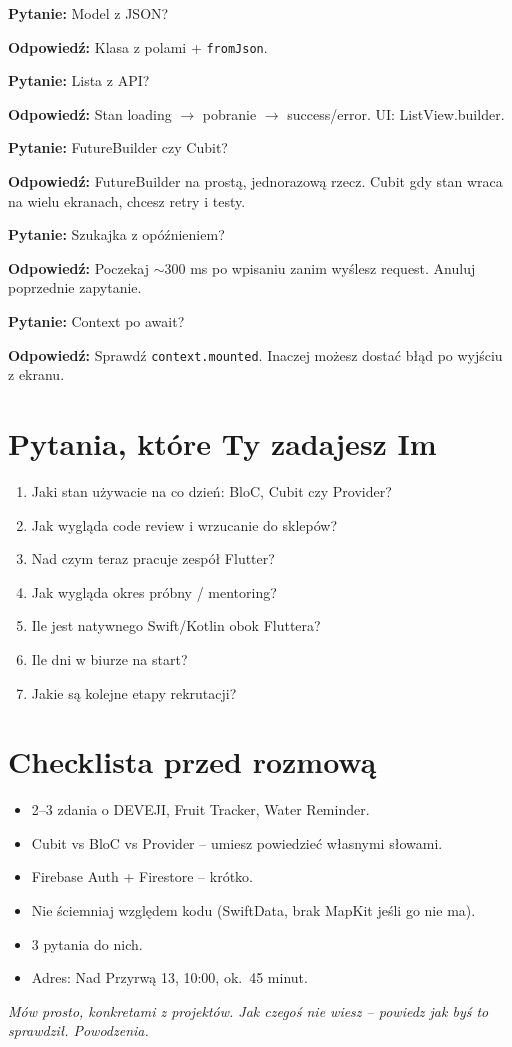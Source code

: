 \documentclass[11pt,a4paper]{article}
\newcommand{\pyt}[1]{\par\medskip\noindent\textbf{Pytanie:} #1\par}
\newcommand{\odp}[1]{\noindent\textbf{Odpowiedź:} #1\par}
\begin{document}
\pyt{Model z JSON?}
\odp{Klasa z polami + \texttt{fromJson}.}

\pyt{Lista z API?}
\odp{Stan loading $\to$ pobranie $\to$ success/error. UI: ListView.builder.}

\pyt{FutureBuilder czy Cubit?}
\odp{FutureBuilder na prostą, jednorazową rzecz. Cubit gdy stan wraca na wielu ekranach, chcesz retry i testy.}

\pyt{Szukajka z opóźnieniem?}
\odp{Poczekaj $\sim$300 ms po wpisaniu zanim wyślesz request. Anuluj poprzednie zapytanie.}

\pyt{Context po await?}
\odp{Sprawdź \texttt{context.mounted}. Inaczej możesz dostać błąd po wyjściu z ekranu.}

\section{Pytania, które Ty zadajesz Im}

\begin{enumerate}
  \item Jaki stan używacie na co dzień: BloC, Cubit czy Provider?
  \item Jak wygląda code review i wrzucanie do sklepów?
  \item Nad czym teraz pracuje zespół Flutter?
  \item Jak wygląda okres próbny / mentoring?
  \item Ile jest natywnego Swift/Kotlin obok Fluttera?
  \item Ile dni w biurze na start?
  \item Jakie są kolejne etapy rekrutacji?
\end{enumerate}

\section{Checklista przed rozmową}

\begin{itemize}
  \item 2--3 zdania o DEVEJI, Fruit Tracker, Water Reminder.
  \item Cubit vs BloC vs Provider -- umiesz powiedzieć własnymi słowami.
  \item Firebase Auth + Firestore -- krótko.
  \item Nie ściemniaj względem kodu (SwiftData, brak MapKit jeśli go nie ma).
  \item 3 pytania do nich.
  \item Adres: Nad Przyrwą 13, 10:00, ok.\ 45 minut.
\end{itemize}

\vspace{1em}
\noindent\textit{Mów prosto, konkretami z projektów. Jak czegoś nie wiesz -- powiedz jak byś to sprawdził. Powodzenia.}
\end{document}
